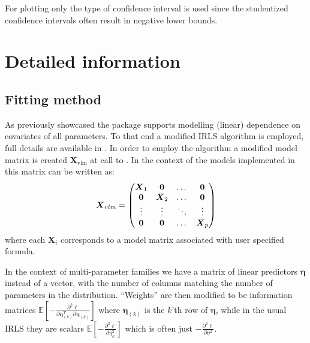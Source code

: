 \documentclass[
]{jss}
\newcommand{\1}{\mathcal{I}} \newcommand{\bx}{\boldsymbol{x}}
\begin{document}
For plotting only the  type of confidence interval is
used since the studentized confidence intervals often result in negative
lower bounds.

\section{Detailed information}\label{detailed-information}

\subsection{Fitting method}\label{fitting-method}

As previously showcased the  package supports
modelling (linear) dependence on covariates of all parameters. To that
end a modified IRLS algorithm is employed, full details are available in
\cite{VGAM-main}. In order to employ the algorithm a modified model
matrix is created \(\boldsymbol{X}_{\text{vlm}}\) at call to
. In the context of the models implemented in
 this matrix can be written as:
\begin{equation}\label{X_vlm-definition}
  \boldsymbol{X}_{vlm}=
  \begin{pmatrix}
    \boldsymbol{X}_{1} & \boldsymbol{0} &\dotso &\boldsymbol{0}\cr
    \boldsymbol{0} & \boldsymbol{X}_{2} &\dotso &\boldsymbol{0}\cr
    \vdots & \vdots & \ddots & \vdots\cr
    \boldsymbol{0} & \boldsymbol{0} &\dotso &\boldsymbol{X}_{p}
  \end{pmatrix}
\end{equation} where each \(\boldsymbol{X}_{i}\) corresponds to a model
matrix associated with user specified formula.

In the context of multi-parameter families we have a matrix of linear
predictors \(\boldsymbol{\eta}\) instead of a vector, with the number of
columns matching the number of parameters in the distribution.
``Weights'' are then modified to be information matrices
\(\displaystyle\mathbb{E}\left[-\frac{\partial^{2}\ell}{\partial\boldsymbol{\eta}_{(k)}^{T}\partial\boldsymbol{\eta}_{(k)}}\right]\)
where \(\boldsymbol{\eta}_{(k)}\) is the \(k\)'th row of
\(\boldsymbol{\eta}\), while in the usual IRLS they are scalars
\(\displaystyle\mathbb{E}\left[-\frac{\partial^{2}\ell}{\partial\eta_{k}^{2}}\right]\)
which is often just
\(\displaystyle-\frac{\partial^{2}\ell}{\partial\eta^{2}}\).
\end{document}
